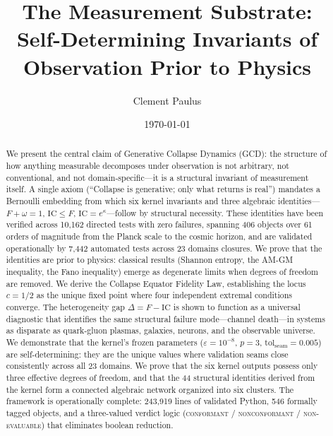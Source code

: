 \documentclass[
  aps,
  prd,
  twocolumn,
  superscriptaddress,
  nofootinbib,
  floatfix
]{revtex4-2}
\newcommand{\eps}{\varepsilon}
\newcommand{\tolseam}{\mathrm{tol}_{\mathrm{seam}}}
\newcommand{\regime}[1]{\textrm{\upshape\scshape#1}}
\newcommand{\conform}{\regime{conformant}}
\newcommand{\nonconform}{\regime{nonconformant}}
\newcommand{\IC}{\mathrm{IC}}
\begin{document}
\title{The Measurement Substrate:
\texorpdfstring{\\}{: }Self-Determining Invariants
of Observation Prior to Physics}

\author{Clement Paulus}

\date{\today}

\begin{abstract}
We present the central claim of Generative Collapse Dynamics (GCD):
the structure of how anything measurable decomposes under observation
is not arbitrary, not conventional, and not domain-specific---it is a
structural invariant of measurement itself.  A single axiom
(``Collapse is generative; only what returns is real'') mandates a
Bernoulli embedding from which six kernel invariants and three
algebraic identities---$F + \omega = 1$, $\IC \leq F$,
$\IC = e^\kappa$---follow by structural necessity.  These identities
have been verified across 10{,}162 directed tests with zero failures,
spanning 406 objects over 61 orders of magnitude from the Planck
scale to the cosmic horizon, and are validated operationally by
7{,}442 automated tests across 23 domains closures.
We prove that the identities are prior to physics: classical results
(Shannon entropy, the AM-GM inequality, the Fano inequality) emerge
as degenerate limits when degrees of freedom are removed.
We derive the Collapse Equator Fidelity Law, establishing the locus
$c = 1/2$ as the unique fixed point where four independent
extremal conditions converge.
The heterogeneity gap $\Delta = F - \IC$ is shown to function as a
universal diagnostic that identifies the same structural failure
mode---channel death---in systems as disparate as quark-gluon
plasmas, galaxies, neurons, and the observable universe.
We demonstrate that the kernel's frozen parameters
($\eps = 10^{-8}$, $p = 3$, $\tolseam = 0.005$) are
self-determining: they are the unique values where validation seams
close consistently across all 23 domains.
We prove that the six kernel outputs possess only three effective
degrees of freedom, and that the 44 structural identities derived
from the kernel form a connected algebraic network organized into
six clusters.
The framework is operationally complete: 243{,}919 lines of
validated Python, 546 formally tagged objects, and a three-valued
verdict logic (\conform{} / \nonconform{} / \regime{non-evaluable})
that eliminates boolean reduction.
\end{abstract}
\end{document}
